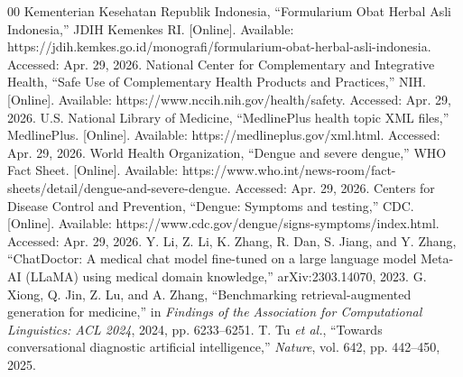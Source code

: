 \documentclass[conference]{IEEEtran}
\begin{document}
\begin{thebibliography}{00}
 Kementerian Kesehatan Republik Indonesia, ``Formularium Obat Herbal Asli Indonesia,'' JDIH Kemenkes RI. [Online]. Available: https://jdih.kemkes.go.id/monografi/formularium-obat-herbal-asli-indonesia. Accessed: Apr. 29, 2026.
 National Center for Complementary and Integrative Health, ``Safe Use of Complementary Health Products and Practices,'' NIH. [Online]. Available: https://www.nccih.nih.gov/health/safety. Accessed: Apr. 29, 2026.
 U.S. National Library of Medicine, ``MedlinePlus health topic XML files,'' MedlinePlus. [Online]. Available: https://medlineplus.gov/xml.html. Accessed: Apr. 29, 2026.
 World Health Organization, ``Dengue and severe dengue,'' WHO Fact Sheet. [Online]. Available: https://www.who.int/news-room/fact-sheets/detail/dengue-and-severe-dengue. Accessed: Apr. 29, 2026.
 Centers for Disease Control and Prevention, ``Dengue: Symptoms and testing,'' CDC. [Online]. Available: https://www.cdc.gov/dengue/signs-symptoms/index.html. Accessed: Apr. 29, 2026.
 Y. Li, Z. Li, K. Zhang, R. Dan, S. Jiang, and Y. Zhang, ``ChatDoctor: A medical chat model fine-tuned on a large language model Meta-AI (LLaMA) using medical domain knowledge,'' arXiv:2303.14070, 2023.
 G. Xiong, Q. Jin, Z. Lu, and A. Zhang, ``Benchmarking retrieval-augmented generation for medicine,'' in \emph{Findings of the Association for Computational Linguistics: ACL 2024}, 2024, pp. 6233--6251.
 T. Tu \emph{et al.}, ``Towards conversational diagnostic artificial intelligence,'' \emph{Nature}, vol. 642, pp. 442--450, 2025.
\end{thebibliography}
\end{document}
